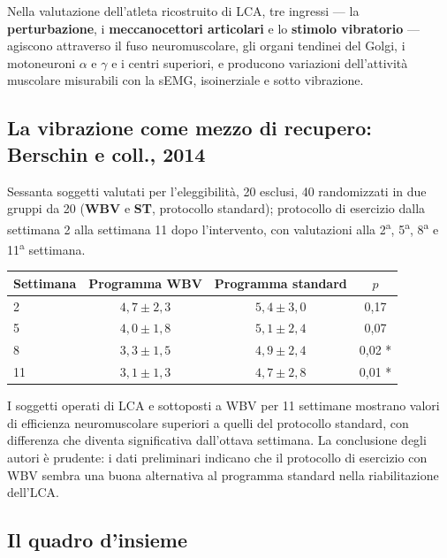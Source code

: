 Nella valutazione dell'atleta ricostruito di LCA, tre ingressi --- la \textbf{perturbazione}, i
\textbf{meccanocettori articolari} e lo \textbf{stimolo vibratorio} --- agiscono attraverso il fuso
neuromuscolare, gli organi tendinei del Golgi, i motoneuroni $\alpha$ e $\gamma$ e i centri
superiori, e producono variazioni dell'attività muscolare misurabili con la sEMG, isoinerziale e
sotto vibrazione.

\subsection{La vibrazione come mezzo di recupero: Berschin e coll., 2014}

Sessanta soggetti valutati per l'eleggibilità, 20 esclusi, 40 randomizzati in due gruppi da 20
(\textbf{WBV} e \textbf{ST}, protocollo standard); protocollo di esercizio dalla settimana 2 alla
settimana 11 dopo l'intervento, con valutazioni alla 2\textsuperscript{a}, 5\textsuperscript{a},
8\textsuperscript{a} e 11\textsuperscript{a} settimana.

\begin{table}[htbp]
  \centering
  \small
  \renewcommand{\arraystretch}{1.3}
  \begin{tabularx}{\textwidth}{|X|c|c|c|}
    \hline
    \textbf{Settimana} & \textbf{Programma WBV} & \textbf{Programma standard} & \textbf{$p$} \\
    \hline
    2 & $4{,}7 \pm 2{,}3$ & $5{,}4 \pm 3{,}0$ & 0,17 \\
    \hline
    5 & $4{,}0 \pm 1{,}8$ & $5{,}1 \pm 2{,}4$ & 0,07 \\
    \hline
    8 & $3{,}3 \pm 1{,}5$ & $4{,}9 \pm 2{,}4$ & 0,02 * \\
    \hline
    11 & $3{,}1 \pm 1{,}3$ & $4{,}7 \pm 2{,}8$ & 0,01 * \\
    \hline
  \end{tabularx}
\end{table}

I soggetti operati di LCA e sottoposti a WBV per 11 settimane mostrano valori di efficienza
neuromuscolare superiori a quelli del protocollo standard, con differenza che diventa significativa
dall'ottava settimana. La conclusione degli autori è prudente: i dati preliminari indicano che il
protocollo di esercizio con WBV sembra una buona alternativa al programma standard nella
riabilitazione dell'LCA.

\subsection{Il quadro d'insieme}

